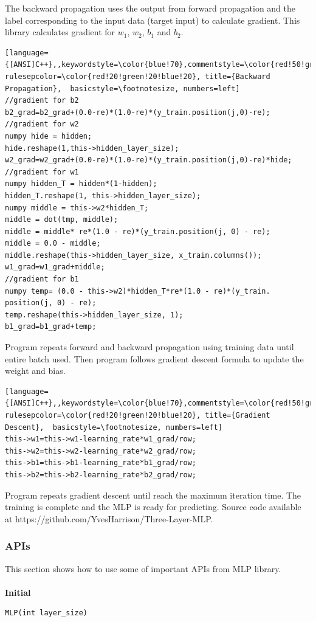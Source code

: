 \documentclass[letterpaper]{article}
\begin{document}
The backward propagation uses the output from forward propagation and the label corresponding to the input data (target input) to calculate gradient. This library calculates gradient for $w_{1}$, $w_{2}$, $b_{1}$ and $b_{2}$.
\begin{lstlisting}[language={[ANSI]C++},,keywordstyle=\color{blue!70},commentstyle=\color{red!50!green!50!blue!50},frame=shadowbox, rulesepcolor=\color{red!20!green!20!blue!20}, title={Backward Propagation},  basicstyle=\footnotesize, numbers=left]  
//gradient for b2
b2_grad=b2_grad+(0.0-re)*(1.0-re)*(y_train.position(j,0)-re);
//gradient for w2		
numpy hide = hidden;
hide.reshape(1,this->hidden_layer_size);
w2_grad=w2_grad+(0.0-re)*(1.0-re)*(y_train.position(j,0)-re)*hide;
//gradient for w1		
numpy hidden_T = hidden*(1-hidden);
hidden_T.reshape(1, this->hidden_layer_size);
numpy middle = this->w2*hidden_T;
middle = dot(tmp, middle);
middle = middle* re*(1.0 - re)*(y_train.position(j, 0) - re);
middle = 0.0 - middle;
middle.reshape(this->hidden_layer_size, x_train.columns());
w1_grad=w1_grad+middle;
//gradient for b1
numpy temp= (0.0 - this->w2)*hidden_T*re*(1.0 - re)*(y_train.
position(j, 0) - re);
temp.reshape(this->hidden_layer_size, 1);
b1_grad=b1_grad+temp;
\end{lstlisting}

Program repeats forward and backward propagation using training data until entire batch used. Then program follows gradient descent formula to update the weight and bias.
\begin{lstlisting}[language={[ANSI]C++},,keywordstyle=\color{blue!70},commentstyle=\color{red!50!green!50!blue!50},frame=shadowbox, rulesepcolor=\color{red!20!green!20!blue!20}, title={Gradient Descent},  basicstyle=\footnotesize, numbers=left]  
this->w1=this->w1-learning_rate*w1_grad/row;
this->w2=this->w2-learning_rate*w2_grad/row;
this->b1=this->b1-learning_rate*b1_grad/row;
this->b2=this->b2-learning_rate*b2_grad/row;
\end{lstlisting}

Program repeats gradient descent until reach the maximum iteration time. The training is complete and the MLP is ready for predicting. Source code available at https://github.com/YvesHarrison/Three-Layer-MLP.

\subsubsection{APIs}
This section shows how to use some of important APIs from MLP library.\\\\
\textbf{\Large Initial}
\begin{lstlisting}[language={[ANSI]C++},keywordstyle=\color{blue!70},commentstyle=\color{red!50!green!50!blue!50},frame=shadowbox, rulesepcolor=\color{red!20!green!20!blue!20}]
MLP(int layer_size)
\end{lstlisting}
\end{document}
